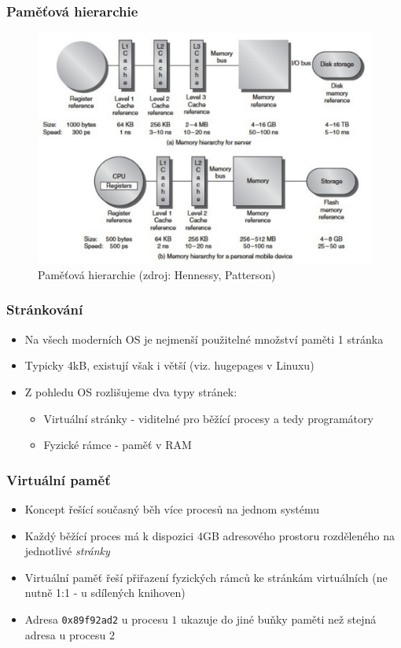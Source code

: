 \documentclass[professionalfonts,svgnames]{beamer}
\begin{document}
\begin{frame}
\frametitle{Paměťová hierarchie}
\begin{figure}[h]
	\includegraphics[width=\textwidth,keepaspectratio]{fig/hier}
	\caption{Paměťová hierarchie (zdroj: Hennessy, Patterson)}
	\label{hier}
\end{figure}
\end{frame}

 \begin{frame}
\frametitle{Stránkování}
\begin{itemize}
\item Na všech moderních OS je nejmenší použitelné množství paměti 1 stránka
\item Typicky 4kB, existují však i větší (viz. hugepages v Linuxu)
\item Z pohledu OS rozlišujeme dva typy stránek:
	\begin{itemize}
		\item Virtuální stránky - viditelné pro běžící procesy a tedy programátory
		\item Fyzické rámce - paměť v RAM
	\end{itemize}
\end{itemize}
\end{frame}

\begin{frame}
\frametitle{Virtuální paměť}
\begin{itemize}
\item Koncept řešící současný běh více procesů na jednom systému
\item Každý běžící proces má k dispozici 4GB adresového prostoru rozděleného na jednotlivé \textit{stránky}
\item Virtuální paměť řeší přiřazení fyzických rámců ke stránkám virtuálních (ne nutně 1:1 - u sdílených knihoven)
\item Adresa \texttt{0x89f92ad2} u procesu $1$ ukazuje do jiné buňky paměti než stejná adresa u procesu $2$
\end{itemize}
\end{frame}
\end{document}

